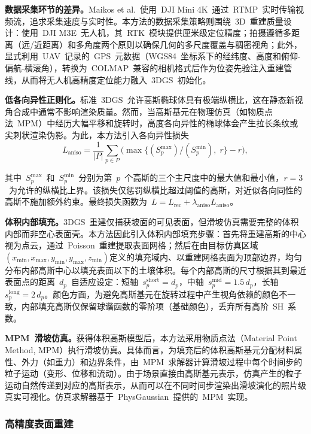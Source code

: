 \textbf{数据采集环节的差异。}Maikos et al.~使用~DJI Mini 4K~通过~RTMP~实时传输视频流，追求采集速度与实时性。本方法的数据采集策略则围绕~3D~重建质量设计：使用~DJI M3E~无人机，其~RTK~模块提供厘米级定位精度；拍摄遵循多距离（远/近距离）和多角度两个原则以确保几何的多尺度覆盖与稠密视角；此外，显式利用~UAV~记录的~GPS~元数据（WGS84~坐标系下的经纬度、高度和俯仰-偏航-横滚角），转换为~COLMAP~兼容的相机格式后作为位姿先验注入重建管线，从而将无人机高精度定位能力融入~3DGS~初始化。

\textbf{低各向异性正则化。}标准~3DGS~允许高斯椭球体具有极端纵横比，这在静态新视角合成中通常不影响渲染质量。然而，当高斯基元在物理仿真（如物质点法~MPM）中经历大幅平移和旋转时，高度各向异性的椭球体会产生拉长条纹或尖刺状渲染伪影。为此，本方法引入各向异性损失
\begin{equation}
L_{\text{aniso}} = \frac{1}{|P|}\sum_{p \in P}\bigl(\max\{(S_p^{\max})/(S_p^{\min}),\; r\} - r\bigr),
\end{equation}

其中~$S_p^{\max}$~和~$S_p^{\min}$~分别为第~$p$~个高斯的三个主尺度中的最大值和最小值，$r=3$~为允许的纵横比上界。该损失仅惩罚纵横比超过阈值的高斯，对近似各向同性的高斯不施加额外约束。最终损失函数为~$L = L_{\text{rec}} + \lambda_{\text{aniso}} L_{\text{aniso}}$。

\textbf{体积内部填充。}3DGS~重建仅捕获坡面的可见表面，但滑坡仿真需要完整的体积内部而非空心表面壳。本方法因此引入体积内部填充步骤：首先将重建高斯的中心视为点云，通过~Poisson~重建提取表面网格；然后在由目标仿真区域$(x_{\min}, x_{\max}, y_{\min}, y_{\max}, z_{\min})$定义的填充域内、以重建网格表面为顶部边界，均匀分布内部高斯中心以填充表面以下的土壤体积。每个内部高斯的尺寸根据其到最近表面点的距离~$d_p$~自适应设定：短轴~$s_p^{\text{short}} = d_p$，中轴~$s_p^{\text{mid}} = 1.5\,d_p$，长轴~$s_p^{\text{long}} = 2\,d_p$。颜色方面，为避免高斯基元在旋转过程中产生视角依赖的颜色不一致，内部填充高斯仅保留球谐函数的零阶项（基础颜色），丢弃所有高阶~SH~系数。

\textbf{MPM~滑坡仿真。}获得体积高斯模型后，本方法采用物质点法（Material Point Method, MPM）执行滑坡仿真。具体而言，为填充后的体积高斯基元分配材料属性、外力（如重力）和边界条件，由~MPM~求解器计算滑坡过程中每个时间步的粒子运动（变形、位移和流动）。由于场景直接由高斯基元表示，仿真产生的粒子运动自然传递到对应的高斯表示，从而可以在不同时间步渲染出滑坡演化的照片级真实可视化。仿真求解器基于~PhysGaussian~提供的~MPM~实现。

\subsubsection{高精度表面重建}

